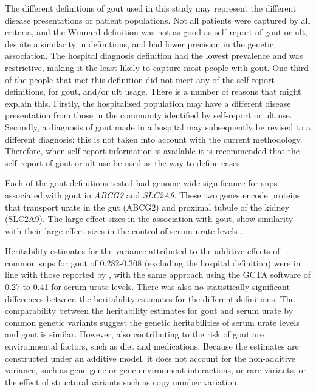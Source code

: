 \documentclass[]{report}
\begin{document}
The different definitions of gout used in this study may represent the
different disease presentations or patient populations. Not all patients
were captured by all criteria, and the Winnard definition was not as
good as self-report of gout or \gls{ult}, despite a similarity in
definitions, and had lower precision in the genetic association. The
hospital diagnosis definition had the lowest prevalence and was
restrictive, making it the least likely to capture most people with
gout. One third of the people that met this definition did not meet any
of the self-report definitions, for gout, and/or \gls{ult} usage. There
is a number of reasons that might explain this. Firstly, the
hospitalised population may have a different disease presentation from
those in the community identified by self-report or \gls{ult} use.
Secondly, a diagnosis of gout made in a hospital may subsequently be
revised to a different diagnosis; this is not taken into account with
the current methodology. Therefore, when self-report information is
available it is recommended that the self-report of gout or \gls{ult}
use be used as the way to define cases.

Each of the gout definitions tested had genome-wide significance for
\glspl{snp} associated with gout in \emph{ABCG2} and \emph{SLC2A9}.
These two genes encode proteins that transport urate in the gut (ABCG2)
and proximal tubule of the kidney (SLC2A9). The large effect sizes in
the association with gout, show similarity with their large effect sizes
in the control of serum urate levels \citep{Kottgen2013}.

Heritability estimates for the variance attributed to the additive
effects of common \glspl{snp} for gout of 0.282-0.308 (excluding the
hospital definition) were in line with those reported by
\citet{Kottgen2013}, with the same approach using the GCTA software of
0.27 to 0.41 for serum urate levels. There was also no statistically
significant differences between the heritability estimates for the
different definitions. The comparability between the heritability
estimates for gout and serum urate by common genetic variants suggest
the genetic heritabilities of serum urate levels and gout is similar.
However, also contributing to the risk of gout are environmental
factors, such as diet and medications. Because the estimates are
constructed under an additive model, it does not account for the
non-additive variance, such as gene-gene or gene-environment
interactions, or rare variants, or the effect of structural variants
such as copy number variation.
\end{document}
